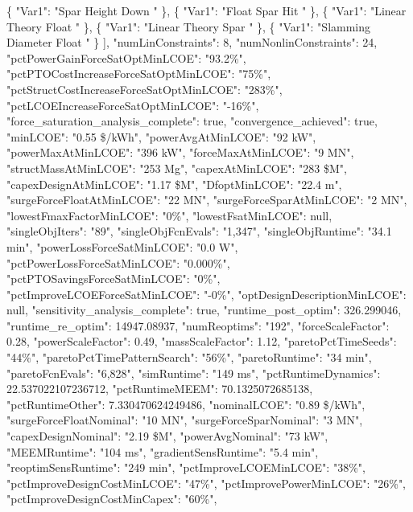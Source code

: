 {{        \{%
          "Var1": "Spar Height Down "%
        \}, %
        \{%
          "Var1": "Float Spar Hit "%
        \}, %
        \{%
          "Var1": "Linear Theory Float "%
        \}, %
        \{%
          "Var1": "Linear Theory Spar "%
        \}, %
        \{%
          "Var1": "Slamming Diameter Float "%
        \}%
      {]}, %
      "numLinConstraints": 8, %
      "numNonlinConstraints": 24, %
      "pctPowerGainForceSatOptMinLCOE": "93.2\%", %
      "pctPTOCostIncreaseForceSatOptMinLCOE": "75\%", %
      "pctStructCostIncreaseForceSatOptMinLCOE": "283\%", %
      "pctLCOEIncreaseForceSatOptMinLCOE": "{-}16\%", %
      "force\_saturation\_analysis\_complete": true, %
      "convergence\_achieved": true, %
      "minLCOE": "0.55 \$/kWh", %
      "powerAvgAtMinLCOE": "92 kW", %
      "powerMaxAtMinLCOE": "396 kW", %
      "forceMaxAtMinLCOE": "9 MN", %
      "structMassAtMinLCOE": "253 Mg", %
      "capexAtMinLCOE": "283 \$M", %
      "capexDesignAtMinLCOE": "1.17 \$M", %
      "DfoptMinLCOE": "22.4 m", %
      "surgeForceFloatAtMinLCOE": "22 MN", %
      "surgeForceSparAtMinLCOE": "2 MN", %
      "lowestFmaxFactorMinLCOE": "0\%", %
      "lowestFsatMinLCOE": null, %
      "singleObjIters": "89", %
      "singleObjFcnEvals": "1,347", %
      "singleObjRuntime": "34.1 min", %
      "powerLossForceSatMinLCOE": "0.0 W", %
      "pctPowerLossForceSatMinLCOE": "0.000\%", %
      "pctPTOSavingsForceSatMinLCOE": "0\%", %
      "pctImproveLCOEForceSatMinLCOE": "{-}0\%", %
      "optDesignDescriptionMinLCOE": null, %
      "sensitivity\_analysis\_complete": true, %
      "runtime\_post\_optim": 326.299046, %
      "runtime\_re\_optim": 14947.08937, %
      "numReoptims": "192", %
      "forceScaleFactor": 0.28, %
      "powerScaleFactor": 0.49, %
      "massScaleFactor": 1.12, %
      "paretoPctTimeSeeds": "44\%", %
      "paretoPctTimePatternSearch": "56\%", %
      "paretoRuntime": "34 min", %
      "paretoFcnEvals": "6,828", %
      "simRuntime": "149 ms", %
      "pctRuntimeDynamics": 22.537022107236712, %
      "pctRuntimeMEEM": 70.1325072685138, %
      "pctRuntimeOther": 7.330470624249486, %
      "nominalLCOE": "0.89 \$/kWh", %
      "surgeForceFloatNominal": "10 MN", %
      "surgeForceSparNominal": "3 MN", %
      "capexDesignNominal": "2.19 \$M", %
      "powerAvgNominal": "73 kW", %
      "MEEMRuntime": "104 ms", %
      "gradientSensRuntime": "5.4 min", %
      "reoptimSensRuntime": "249 min", %
      "pctImproveLCOEMinLCOE": "38\%", %
      "pctImproveDesignCostMinLCOE": "47\%", %
      "pctImprovePowerMinLCOE": "26\%", %
      "pctImproveDesignCostMinCapex": "60\%", %
}}
